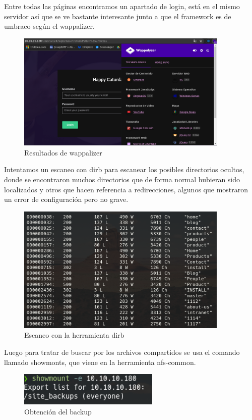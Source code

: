 \documentclass{article}
\begin{document}
\clearpage

Entre todas las páginas encontramos un apartado de login, está en el mismo servidor así que se ve bastante interesante junto a que el framework es de umbraco según el wappalizer.
\begin{figure}[h!]
	\center 
	\includegraphics[width=0.9\textwidth]{images/remote/wappalizer.png}
	\caption{Resultados de wappalizer}
\end{figure}

Intentamos un escaneo con dirb para escanear los posibles directorios ocultos, donde se encontraron muchos directorios que de forma normal hubieran sido localizados y otros que hacen referencia a redirecciones, algunos que mostraron un error de configuración pero no grave.
\begin{figure}[h!]
	\center 
	\includegraphics[width=0.9\textwidth]{images/remote/dirb.png}
	\caption{Escaneo con la herramienta dirb}
\end{figure}

\clearpage

Luego para tratar de buscar por los archivos compartidos se usa el comando llamado showmonts, que viene en la herramienta nfs-common.
\begin{figure}[h]
	\center 
	\includegraphics[width=0.6\textwidth]{images/remote/nfs.png}
	\caption{Obtención del backup}
\end{figure}
\end{document}
